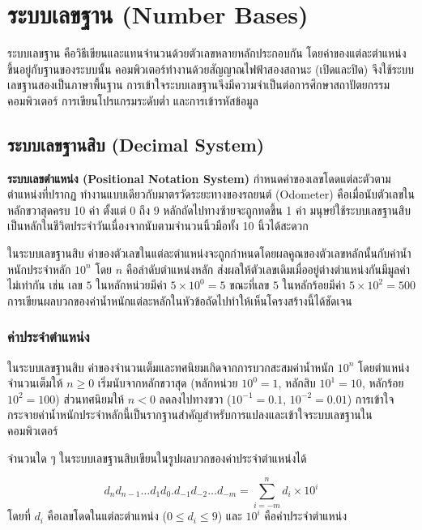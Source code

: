 \chapter{ระบบเลขฐาน (Number Bases)}
\label{ch:number-bases}

ระบบเลขฐาน คือวิธีเขียนและแทนจำนวนด้วยตัวเลขหลายหลักประกอบกัน โดยค่าของแต่ละตำแหน่งขึ้นอยู่กับฐานของระบบนั้น คอมพิวเตอร์ทำงานด้วยสัญญาณไฟฟ้าสองสถานะ (เปิดและปิด) จึงใช้ระบบเลขฐานสองเป็นภาษาพื้นฐาน การเข้าใจระบบเลขฐานจึงมีความจำเป็นต่อการศึกษาสถาปัตยกรรมคอมพิวเตอร์ การเขียนโปรแกรมระดับต่ำ และการเข้ารหัสข้อมูล~\parencite{mano2018digital}

\section{ระบบเลขฐานสิบ (Decimal System)}
\label{sec:decimal-system}

\textbf{ระบบเลขตำแหน่ง (Positional Notation System)} กำหนดค่าของเลขโดดแต่ละตัวตามตำแหน่งที่ปรากฏ ทำงานแบบเดียวกับมาตรวัดระยะทางของรถยนต์ (Odometer) คือเมื่อนับตัวเลขในหลักขวาสุดครบ 10 ค่า ตั้งแต่ $0$ ถึง $9$ หลักถัดไปทางซ้ายจะถูกทดขึ้น 1 ค่า มนุษย์ใช้ระบบเลขฐานสิบเป็นหลักในชีวิตประจำวันเนื่องจากนับตามจำนวนนิ้วมือทั้ง 10 นิ้วได้สะดวก

ในระบบเลขฐานสิบ ค่าของตัวเลขในแต่ละตำแหน่งจะถูกกำหนดโดยผลคูณของตัวเลขหลักนั้นกับค่าน้ำหนักประจำหลัก $10^n$ โดย $n$ คือลำดับตำแหน่งหลัก ส่งผลให้ตัวเลขเดิมเมื่ออยู่ต่างตำแหน่งกันมีมูลค่าไม่เท่ากัน เช่น เลข $5$ ในหลักหน่วยมีค่า $5\times10^0=5$ ขณะที่เลข $5$ ในหลักร้อยมีค่า $5\times10^2=500$ การเขียนผลบวกของค่าน้ำหนักแต่ละหลักในหัวข้อถัดไปทำให้เห็นโครงสร้างนี้ได้ชัดเจน

\subsection{ค่าประจำตำแหน่ง}
ในระบบเลขฐานสิบ ค่าของจำนวนเต็มและทศนิยมเกิดจากการบวกสะสมค่าน้ำหนัก $10^n$ โดยตำแหน่งจำนวนเต็มให้ $n \ge 0$ เริ่มนับจากหลักขวาสุด (หลักหน่วย $10^0=1$, หลักสิบ $10^1=10$, หลักร้อย $10^2=100$) ส่วนทศนิยมให้ $n < 0$ ลดลงไปทางขวา ($10^{-1}=0.1$, $10^{-2}=0.01$) การเข้าใจกระจายค่าน้ำหนักประจำหลักนี้เป็นรากฐานสำคัญสำหรับการแปลงและเข้าใจระบบเลขฐานในคอมพิวเตอร์~\parencite{mano2018digital}

\begin{definition}
\label{def:decimal-place-value}
จำนวนใด ๆ ในระบบเลขฐานสิบเขียนในรูปผลบวกของค่าประจำตำแหน่งได้

$$d_n d_{n-1} \ldots d_1 d_0 . d_{-1} d_{-2} \ldots d_{-m} = \sum_{i=-m}^{n} d_i \times 10^i$$
โดยที่ $d_i$ คือเลขโดดในแต่ละตำแหน่ง ($0 \le d_i \le 9$) และ $10^i$ คือค่าประจำตำแหน่ง
\end{definition}

